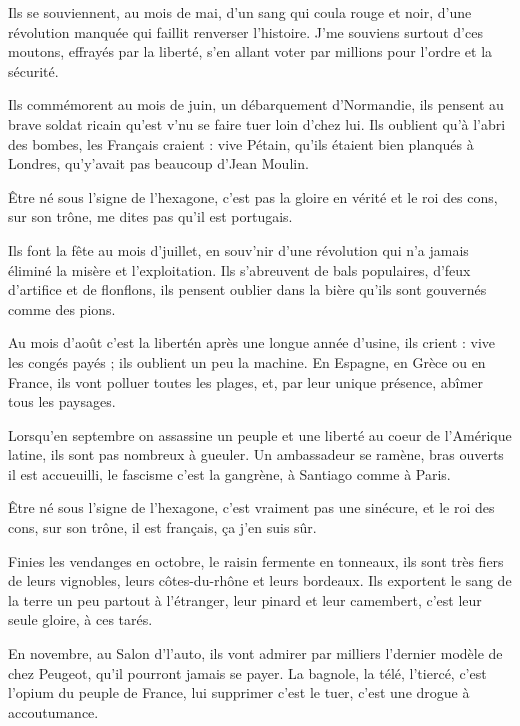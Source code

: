 \beginverse
Ils se souviennent, au mois de mai,
d'un sang qui coula rouge et noir,
d'une révolution manquée
qui faillit renverser l'histoire.
J'me souviens surtout d'ces moutons,
effrayés par la liberté, s'en allant voter par millions
pour l'ordre et la sécurité.
\endverse

\beginverse
Ils commémorent au mois de juin,
un débarquement d'Normandie,
ils pensent au brave soldat ricain
qu'est v'nu se faire tuer loin d'chez lui.
Ils oublient qu'à l'abri des bombes,
les Français craient : vive Pétain,
qu'ils étaient bien planqués à Londres,
qu'y'avait pas beaucoup d'Jean Moulin.
\endverse

\beginverse
Être né sous l'signe de l'hexagone,
c'est pas la gloire en vérité
et le roi des cons, sur son trône,
me dites pas qu'il est portugais.
\endverse

\beginverse
Ils font la fête au mois d'juillet,
en souv'nir d'une révolution
qui n'a jamais éliminé
la misère et l'exploitation.
Ils s'abreuvent de bals populaires,
d'feux d'artifice et de flonflons,
ils pensent oublier dans la bière
qu'ils sont gouvernés comme des pions.
\endverse

\beginverse
Au mois d'août c'est la libertén
après une longue année d'usine,
ils crient : vive les congés payés ;
ils oublient un peu la machine.
En Espagne, en Grèce ou en France,
ils vont polluer toutes les plages,
et, par leur unique présence,
abîmer tous les paysages.
\endverse

\beginverse
Lorsqu'en septembre on assassine
un peuple et une liberté
au coeur de l'Amérique latine,
ils sont pas nombreux à gueuler.
Un ambassadeur se ramène,
bras ouverts il est accueuilli,
le fascisme c'est la gangrène,
à Santiago comme à Paris.
\endverse

\beginverse
Être né sous l'signe de l'hexagone,
c'est vraiment pas une sinécure,
et le roi des cons, sur son trône,
il est français, ça j'en suis sûr.
\endverse

\beginverse
Finies les vendanges en octobre,
le raisin fermente en tonneaux,
ils sont très fiers de leurs vignobles,
leurs côtes-du-rhône et leurs bordeaux.
Ils exportent le sang de la terre
un peu partout à l'étranger,
leur pinard et leur camembert,
c'est leur seule gloire, à ces tarés.
\endverse

\beginverse
En novembre, au Salon d'l'auto,
ils vont admirer par milliers
l'dernier modèle de chez Peugeot,
qu'il pourront jamais se payer.
La bagnole, la télé, l'tiercé,
c'est l'opium du peuple de France,
lui supprimer c'est le tuer,
c'est une drogue à accoutumance.
\endverse

